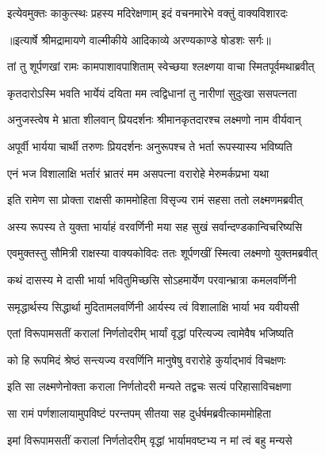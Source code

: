 \twolineshloka
{इत्येवमुक्तः काकुत्स्थः प्रहस्य मदिरेक्षणाम्}
{इदं वचनमारेभे वक्तुं वाक्यविशारदः} %


{॥इत्यार्षे श्रीमद्रामायणे वाल्मीकीये आदिकाव्ये अरण्यकाण्डे षोडशः सर्गः॥}


\twolineshloka
{तां तु शूर्पणखां रामः कामपाशावपाशिताम्}
{स्वेच्छया श्लक्ष्णया वाचा स्मितपूर्वमथाब्रवीत्} %

\twolineshloka
{कृतदारोऽस्मि भवति भार्येयं दयिता मम}
{त्वद्विधानां तु नारीणां सुदुःखा ससपत्नता} %

\twolineshloka
{अनुजस्त्वेष मे भ्राता शीलवान् प्रियदर्शनः}
{श्रीमानकृतदारश्च लक्ष्मणो नाम वीर्यवान्} %

\twolineshloka
{अपूर्वी भार्यया चार्थी तरुणः प्रियदर्शनः}
{अनुरूपश्च ते भर्ता रूपस्यास्य भविष्यति} %

\twolineshloka
{एनं भज विशालाक्षि भर्तारं भ्रातरं मम}
{असपत्ना वरारोहे मेरुमर्कप्रभा यथा} %

\twolineshloka
{इति रामेण सा प्रोक्ता राक्षसी काममोहिता}
{विसृज्य रामं सहसा ततो लक्ष्मणमब्रवीत्} %

\twolineshloka
{अस्य रूपस्य ते युक्ता भार्याहं वरवर्णिनी}
{मया सह सुखं सर्वान्दण्डकान्विचरिष्यसि} %

\twolineshloka
{एवमुक्तस्तु सौमित्री राक्षस्या वाक्यकोविदः}
{ततः शूर्पणखीं स्मित्वा लक्ष्मणो युक्तमब्रवीत्} %

\twolineshloka
{कथं दासस्य मे दासी भार्या भवितुमिच्छसि}
{सोऽहमार्येण परवान्भ्रात्रा कमलवर्णिनी} %

\twolineshloka
{समृद्धार्थस्य सिद्धार्था मुदितामलवर्णिनी}
{आर्यस्य त्वं विशालाक्षि भार्या भव यवीयसी} %

\twolineshloka
{एतां विरूपामसतीं करालां निर्णतोदरीम्}
{भार्यां वृद्धां परित्यज्य त्वामेवैष भजिष्यति} %

\twolineshloka
{को हि रूपमिदं श्रेष्ठं सन्त्यज्य वरवर्णिनि}
{मानुषेषु वरारोहे कुर्याद्भावं विचक्षणः} %

\twolineshloka
{इति सा लक्ष्मणेनोक्ता कराला निर्णतोदरी}
{मन्यते तद्वचः सत्यं परिहासाविचक्षणा} %

\twolineshloka
{सा रामं पर्णशालायामुपविष्टं परन्तपम्}
{सीतया सह दुर्धर्षमब्रवीत्काममोहिता} %

\twolineshloka
{इमां विरूपामसतीं करालां निर्णतोदरीम्}
{वृद्धां भार्यामवष्टभ्य न मां त्वं बहु मन्यसे} %

